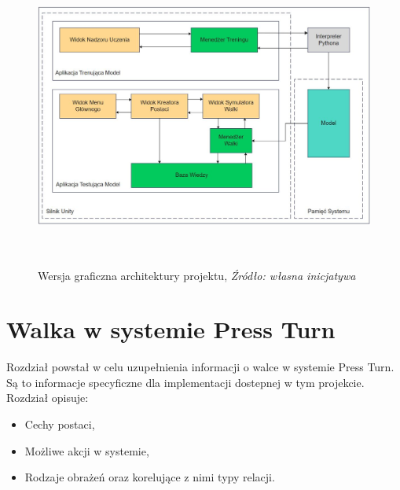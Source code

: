 \documentclass{SGGW-thesis}
\begin{document}
\begin{figure}[H]
  \centering
  \includegraphics[height=10cm]{architecture.JPG}
  \caption{Wersja graficzna architektury projektu, \textit{Źródło: własna inicjatywa}}
\end{figure}

\pagebreak
\section{Walka w systemie Press Turn}
\label{systempressturn}
Rozdział powstał w celu uzupełnienia informacji o walce w systemie Press Turn. Są to informacje specyficzne dla implementacji dostepnej w tym projekcie. 
Rozdział opisuje:
\begin{itemize}
  \item Cechy postaci,
  \item Możliwe akcji w systemie,
  \item Rodzaje obrażeń oraz korelujące z nimi typy relacji.
\end{itemize}
\end{document}
